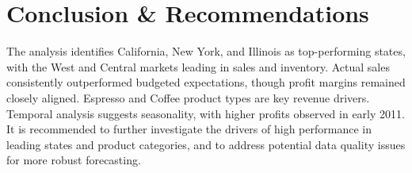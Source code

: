 \documentclass[11pt]{article}
\begin{document}
\section{Conclusion \& Recommendations}
The analysis identifies California, New York, and Illinois as top-performing states, with the West and Central markets leading in sales and inventory. Actual sales consistently outperformed budgeted expectations, though profit margins remained closely aligned. Espresso and Coffee product types are key revenue drivers. Temporal analysis suggests seasonality, with higher profits observed in early 2011. It is recommended to further investigate the drivers of high performance in leading states and product categories, and to address potential data quality issues for more robust forecasting.
\end{document}
